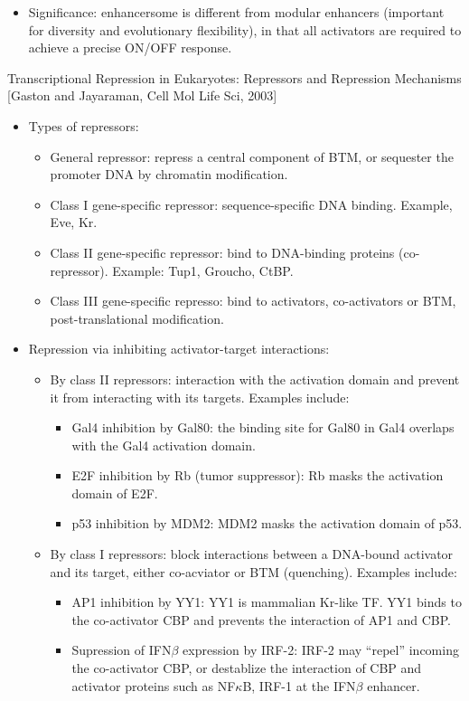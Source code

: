 \documentclass{report}
\begin{document}
\begin{itemize}
	\item Significance: enhancersome is different from modular enhancers (important for diversity and evolutionary flexibility), in that all activators are required to achieve a precise ON/OFF response. 
\end{itemize}

Transcriptional Repression in Eukaryotes: Repressors and Repression Mechanisms [Gaston and Jayaraman, Cell Mol Life Sci, 2003]
\begin{itemize}
	\item Types of repressors: 
	\begin{itemize}
		\item General repressor: repress a central component of BTM, or sequester the promoter DNA by chromatin modification. 
		\item Class I gene-specific repressor: sequence-specific DNA binding. Example, Eve, Kr. 
		\item Class II gene-specific repressor: bind to DNA-binding proteins (co-repressor). Example: Tup1, Groucho, CtBP. 
		\item Class III gene-specific represso: bind to activators, co-activators or BTM, post-translational modification. 
	\end{itemize}
	
	\item Repression via inhibiting activator-target interactions: 
	\begin{itemize}
		\item By class II repressors: interaction with the activation domain and prevent it from interacting with its targets. Examples include: 
		\begin{itemize}
			\item Gal4 inhibition by Gal80: the binding site for Gal80 in Gal4 overlaps with the Gal4 activation domain. 
			\item E2F inhibition by Rb (tumor suppressor): Rb masks the activation domain of E2F. 
			\item p53 inhibition by MDM2: MDM2 masks the activation domain of p53.  
		\end{itemize} 
		
		\item By class I repressors: block interactions between a DNA-bound activator and its target, either co-acviator or BTM (quenching). Examples include: 
		\begin{itemize}
			\item AP1 inhibition by YY1: YY1 is mammalian Kr-like TF. YY1 binds to the co-activator CBP and prevents the interaction of AP1 and CBP.  
			\item Supression of IFN$\beta$ expression by IRF-2: IRF-2 may ``repel'' incoming the co-activator CBP, or destablize the interaction of CBP and activator proteins such as NF$\kappa$B, IRF-1 at the IFN$\beta$ enhancer. 
		\end{itemize}
	\end{itemize}
\end{itemize}
\end{document}
